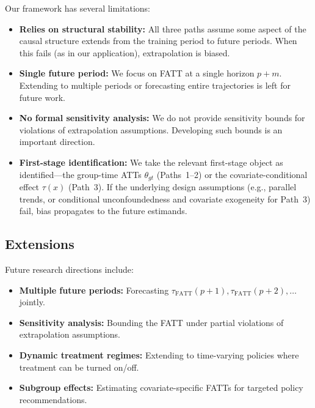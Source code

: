 \documentclass{article}
\begin{document}
Our framework has several limitations:
\begin{itemize}
\item \textbf{Relies on structural stability:} All three paths assume some aspect of the causal structure extends from the training period to future periods. When this fails (as in our application), extrapolation is biased.
\item \textbf{Single future period:} We focus on FATT at a single horizon $p+m$. Extending to multiple periods or forecasting entire trajectories is left for future work.
\item \textbf{No formal sensitivity analysis:} We do not provide sensitivity bounds for violations of extrapolation assumptions. Developing such bounds is an important direction.
\item \textbf{First-stage identification:} We take the relevant first-stage object as identified---the group-time ATTs $\theta_{gt}$ (Paths~1--2) or the covariate-conditional effect $\tau(x)$ (Path~3). If the underlying design assumptions (e.g., parallel trends, or conditional unconfoundedness and covariate exogeneity for Path~3) fail, bias propagates to the future estimands.
\end{itemize}

\subsection{Extensions}


Future research directions include:
\begin{itemize}
\item \textbf{Multiple future periods:} Forecasting $\tau_{\text{FATT}}(p+1), \tau_{\text{FATT}}(p+2), \ldots$ jointly.
\item \textbf{Sensitivity analysis:} Bounding the FATT under partial violations of extrapolation assumptions.
\item \textbf{Dynamic treatment regimes:} Extending to time-varying policies where treatment can be turned on/off.
\item \textbf{Subgroup effects:} Estimating covariate-specific FATTs for targeted policy recommendations.
\end{itemize}




\end{document}

